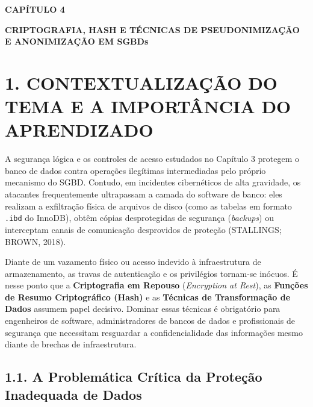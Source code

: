 
\begin{center}
\textbf{\fontsize{14}{16}\selectfont CAPÍTULO 4}

\vspace{0.5em}

\textbf{\fontsize{14}{16}\selectfont CRIPTOGRAFIA, HASH E TÉCNICAS DE PSEUDONIMIZAÇÃO E ANONIMIZAÇÃO EM SGBDs}
\end{center}

\vspace{1.5em}

\section*{1. CONTEXTUALIZAÇÃO DO TEMA E A IMPORTÂNCIA DO APRENDIZADO}

A segurança lógica e os controles de acesso estudados no Capítulo 3 protegem o banco de dados contra operações ilegítimas intermediadas pelo próprio mecanismo do SGBD. Contudo, em incidentes cibernéticos de alta gravidade, os atacantes frequentemente ultrapassam a camada do software de banco: eles realizam a exfiltração física de arquivos de disco (como as tabelas em formato \texttt{.ibd} do InnoDB), obtêm cópias desprotegidas de segurança (\textit{backups}) ou interceptam canais de comunicação desprovidos de proteção (STALLINGS; BROWN, 2018).

Diante de um vazamento físico ou acesso indevido à infraestrutura de armazenamento, as travas de autenticação e os privilégios tornam-se inócuos. É nesse ponto que a \textbf{Criptografia em Repouso} (\textit{Encryption at Rest}), as \textbf{Funções de Resumo Criptográfico (Hash)} e as \textbf{Técnicas de Transformação de Dados} assumem papel decisivo. Dominar essas técnicas é obrigatório para engenheiros de software, administradores de bancos de dados e profissionais de segurança que necessitam resguardar a confidencialidade das informações mesmo diante de brechas de infraestrutura.

\subsection*{1.1. A Problemática Crítica da Proteção Inadequada de Dados}

